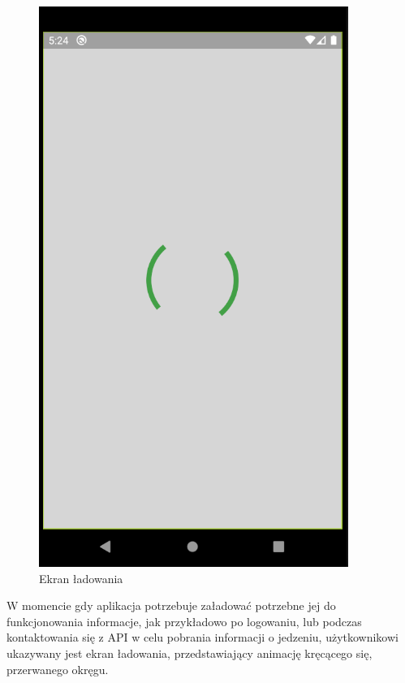 \documentclass[12pt, a4paper]{article}
\begin{document}
\begin{sloppypar}
{{    \begin{figure}[H]
      \centering
      \includegraphics[scale=0.9]{screen_loading.PNG}
      \caption{Ekran ładowania}
      \label{fig:screen_loading}
    \end{figure}

    W momencie gdy aplikacja potrzebuje załadować potrzebne jej do funkcjonowania informacje,
    jak przykładowo po logowaniu, lub podczas kontaktowania się z API w celu pobrania
    informacji o jedzeniu, użytkownikowi ukazywany jest ekran ładowania, przedstawiający animację
    kręcącego się, przerwanego okręgu.

}}
\end{sloppypar}
\end{document}
